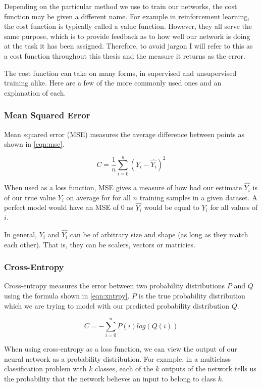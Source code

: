 Depending on the particular method we use to train our networks, the cost function may be given a different name. For example in reinforcement learning, the cost function is typically called a value function. However, they all serve the same purpose, which is to provide feedback as to how well our network is doing at the task it has been assigned. Therefore, to avoid jargon I will refer to this as a cost function throughout this thesis and the measure it returns as the error.

The cost function can take on many forms, in supervised and unsupervised training alike. Here are a few of the more commonly used ones and an explanation of each.

\subsubsection{Mean Squared Error}
Mean squared error (MSE) measures the average difference between points as shown in \autoref{eqn:mse}.

\begin{equation} \label{eqn:mse}
C = \frac{1}{n}\sum_{i=0}^{n} (Y_i - \hat{Y_i})^2
\end{equation}

When used as a loss function, MSE gives a measure of how bad our estimate $\hat{Y_i}$ is of our true value $Y_i$ on average for for all $n$ training samples in a given dataset. A perfect model would have an MSE of 0 as $\hat{Y_i}$ would be equal to $Y_i$ for all values of $i$.

In general, $Y_i$ and $\hat{Y_i}$ can be of arbitrary size and shape (as long as they match each other). That is, they can be scalers, vectors or matricies.

\subsubsection{Cross-Entropy}
Cross-entropy measures the error between two probability distributions $P$ and $Q$ using the formula shown in \autoref{eqn:xntrpy}. $P$ is the true probability distribution which we are trying to model with our predicted probability distribution $Q$.

\begin{equation} \label{eqn:xntrpy}
C = -\sum_{i=0}^{n}P(i) log(Q(i))
\end{equation}

When using cross-entropy as a loss function, we can view the output of our neural network as a probability distribution. For example, in a multiclass classification problem with $k$ classes, each of the $k$ outputs of the network tells us the probability that the network believes an input to belong to class $k$.

